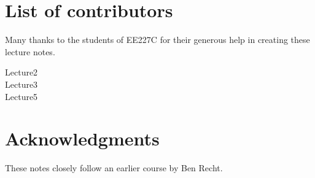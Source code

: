 \section{List of contributors}

Many thanks to the students of EE227C for their generous help in creating these
lecture notes.

\begin{description}
\item[Lecture2]
\item[Lecture3]
\item[Lecture5]
\end{description}

\section{Acknowledgments}

These notes closely follow an earlier course by Ben Recht.
